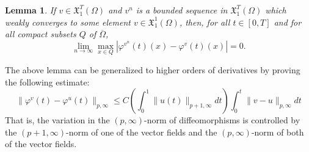 \documentclass[a5paper,11pt,twoside]{article}
\theoremstyle{plain}
\newtheorem{lem}[teo]{Lemma}
\newcommand{\X}{\ensuremath{\mathfrak{X}}}
\theoremstyle{definition}
\begin{document}
\begin{lem}\label{pointwise}
If $v\in\X_1^T(\Omega)$ and $v^n$ is a bounded sequence in $\X_1^T(\Omega)$ which weakly converges to some element $v\in\X_1^1(\Omega)$, then, for all $t\in[0,T]$ and for all compact subsets $Q$ of $\overline{\Omega}$,
\[
\lim_{n\to\infty}\max_{x\in Q}\left|\varphi^{v^n}(t)(x)-\varphi^{v}(t)(x)\right|=0.
\]
\end{lem}
The above lemma can be generalized to higher orders of derivatives by proving the following estimate:
%
\begin{equation} 
\label{eq:estimate}
\|\varphi^v(t)-\varphi^{u}(t)\|_{p,\infty}\leq C\left(\int_0^1\|u(t)\|_{p+1,\infty}dt\right)\int_0^t\|v-u\|_{p,\infty} dt
\end{equation}
%
That is, the variation in the $(p,\infty)$-norm of diffeomorphisms is controlled by the $(p+1,\infty)$-norm of one of the vector fields and the $(p,\infty)$-norm of both of the vector fields.
\end{document}
